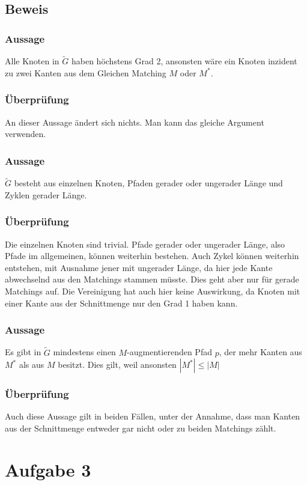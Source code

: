 \documentclass[a4paper,11pt,twoside]{scrartcl}
\begin{document}
\subsection*{Beweis}
\subsubsection*{Aussage}
Alle Knoten in $\tilde{G}$ haben höchstens Grad 2, ansonsten wäre ein Knoten inzident zu zwei Kanten aus dem Gleichen Matching $M$ oder $M^*$.
\subsubsection*{Überprüfung}
An dieser Aussage ändert sich nichts. Man kann das gleiche Argument verwenden.

\subsubsection*{Aussage}
$\tilde{G}$ besteht aus einzelnen Knoten, Pfaden gerader oder ungerader Länge und Zyklen gerader Länge.
\subsubsection*{Überprüfung}
Die einzelnen Knoten sind trivial. Pfade gerader oder ungerader Länge, also Pfade im allgemeinen, können weiterhin bestehen. Auch Zykel können weiterhin entstehen, mit Ausnahme jener mit ungerader Länge, da hier jede Kante abwechselnd aus den Matchings stammen müsste. Dies geht aber nur für gerade Matchings auf. Die Vereinigung hat auch hier keine Auswirkung, da Knoten mit einer Kante aus der Schnittmenge nur den Grad 1 haben kann.

\subsubsection*{Aussage}
Es gibt in $\tilde{G}$ mindestens einen $M$-augmentierenden Pfad $p$, der mehr Kanten aus $M^*$ als aus $M$ besitzt. Dies gilt, weil ansonsten $|M^*| \leq |M|$
\subsubsection*{Überprüfung}
Auch diese Aussage gilt in beiden Fällen, unter der Annahme, dass man Kanten aus der Schnittmenge entweder gar nicht oder zu beiden Matchings zählt.
\section*{Aufgabe 3}
\end{document}
